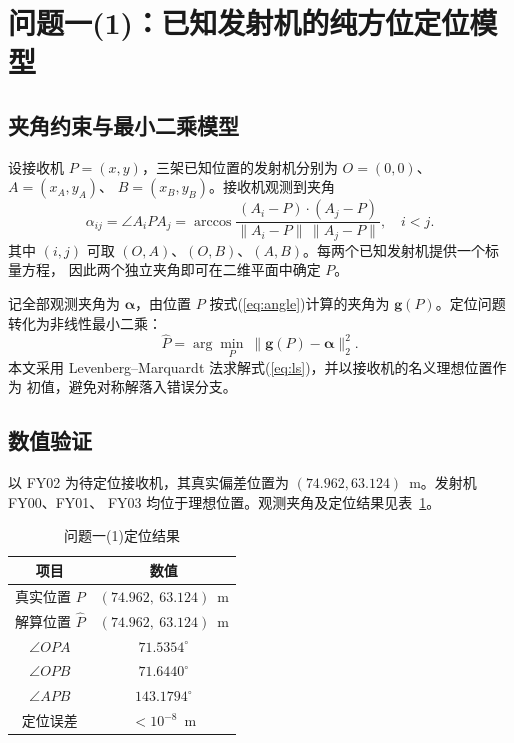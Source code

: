 \documentclass[UTF8,a4paper,11pt]{ctexart}
\begin{document}
\section{问题一(1)：已知发射机的纯方位定位模型}

\subsection{夹角约束与最小二乘模型}

设接收机 $P=(x,y)$，三架已知位置的发射机分别为 $O=(0,0)$、$A=(x_A,y_A)$、
$B=(x_B,y_B)$。接收机观测到夹角
\begin{equation}
\alpha_{ij}=\angle A_i P A_j
=\arccos\frac{(A_i-P)\cdot(A_j-P)}
{\|A_i-P\|\,\|A_j-P\|},\quad i<j.
\label{eq:angle}
\end{equation}
其中 $(i,j)$ 可取 $(O,A)$、$(O,B)$、$(A,B)$。每两个已知发射机提供一个标量方程，
因此两个独立夹角即可在二维平面中确定 $P$。

记全部观测夹角为 $\boldsymbol\alpha$，由位置 $P$ 按式(\ref{eq:angle})计算的夹角为
$\boldsymbol g(P)$。定位问题转化为非线性最小二乘：
\begin{equation}
\hat P=\arg\min_{P}\ \big\|\boldsymbol g(P)-\boldsymbol\alpha\big\|_2^2.
\label{eq:ls}
\end{equation}
本文采用 Levenberg--Marquardt 法求解式(\ref{eq:ls})，并以接收机的名义理想位置作为
初值，避免对称解落入错误分支。

\subsection{数值验证}

以 FY02 为待定位接收机，其真实偏差位置为 $(74.962,63.124)$~m。发射机 FY00、FY01、
FY03 均位于理想位置。观测夹角及定位结果见表~\ref{tab:q11}。

\begin{table}[H]
\centering
\caption{问题一(1)定位结果}
\label{tab:q11}
\begin{tabular}{cc}
\toprule
项目 & 数值 \\
\midrule
真实位置 $P$ & $(74.962,\ 63.124)$~m \\
解算位置 $\hat P$ & $(74.962,\ 63.124)$~m \\
$\angle OPA$ & $71.5354^\circ$ \\
$\angle OPB$ & $71.6440^\circ$ \\
$\angle APB$ & $143.1794^\circ$ \\
定位误差 & $<10^{-8}$~m \\
\bottomrule
\end{tabular}
\end{table}
\end{document}
